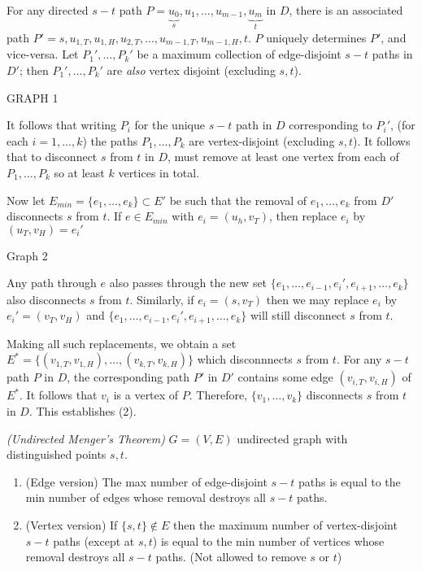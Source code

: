 \documentclass{article}
\begin{document}
For any directed $s-t$ path $P=\underbrace{u_0}_{s}, u_1, \ldots, u_{m-1}, \underbrace{u_m}_t$ in $D$, there is an associated path $P'= s, u_{1,T}, u_{1,H}, u_{2,T}, \ldots, u_{m-1,T}, u_{m-1,H},t$.  $P$ uniquely determines $P'$, and vice-versa.  Let $P_1', \ldots, P_k'$ be a maximum collection of edge-disjoint $s-t$ paths in $D'$; then $P_1', \ldots, P_k'$ are \emph{also} vertex disjoint (excluding $s,t$).

GRAPH 1

It follows that writing $P_i$ for the unique $s-t$ path in $D$ corresponding to $P_i'$, (for each $i=1,\ldots,k$) the paths $P_1,\ldots,P_k$ are vertex-disjoint (excluding $s,t$).  It follows that to disconnect $s$ from $t$ in $D$, must remove at least one vertex from each of $P_1, \ldots, P_k$ so at least $k$ vertices in total.  

Now let $E_{min} = \{e_1, \ldots, e_k\} \subset E'$ be such that the removal of $e_1, \ldots, e_k$ from $D'$ disconnects $s$ from $t$.  If $e \in E_{min}$ with $e_i= (u_h,v_T)$, then replace $e_i$ by $(u_T,v_H)=e_i'$

Graph 2

Any path through $e$ also passes through the new set $\{e_1, \ldots, e_{i-1}, e_i', e_{i+1}, \ldots, e_k\}$ also disconnects $s$ from $t$.  Similarly, if $e_i =(s,v_T)$ then we may replace $e_i$ by $e_i'=(v_T, v_H)$ and $\{e_1, \ldots, e_{i-1}, e_i', e_{i+1}, \ldots, e_k\}$ will still disconnect $s$ from $t$.

Making all such replacements, we obtain a set $E^*=\{(v_{1,T}, v_{1,H}), \ldots,( v_{k,T}, v_{k,H} )\}$ which disconnnects $s$ from $t$.  For any $s-t$ path $P$ in $D$, the corresponding path $P'$ in $D'$ contains some edge $(v_{i,T}, v_{i,H})$ of $E^*$.  It follows that $v_i$ is a vertex of $P$. Therefore, $\{v_1, \ldots, v_k\}$ disconnects $s$ from $t$ in $D$.  This establishes (2).

\begin{thm}
\emph{(Undirected Menger's Theorem)} $G=(V,E)$ undirected graph with distinguished points $s,t$.

\begin{enumerate}
 \item (Edge version)  The max number of edge-disjoint $s-t$ paths is equal to the min number of edges whose removal destroys all $s-t$ paths.
\item (Vertex version) If $\{s,t \} \notin E$ then the maximum number of vertex-disjoint $s-t$ paths (except at $s,t$) is equal to the min number of vertices whose removal destroys all $s-t$ paths. (Not allowed to remove $s$ or $t$)
\end{enumerate}
\end{thm}
\end{document}
